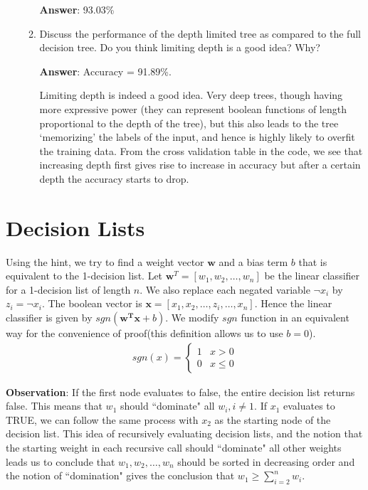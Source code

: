 \documentclass{article}
\begin{document}
\begin{enumerate}
\begin{enumerate}
            \textbf{Answer}: 93.03\%
            \item Discuss the performance of the depth limited tree as compared to the full decision tree. Do you think limiting depth is a good idea? Why?
            
            \textbf{Answer}: Accuracy = 91.89\%.
            
            Limiting depth is indeed a good idea. Very deep trees, though having more expressive power (they can represent boolean functions of length proportional to the depth of the tree), but this also leads to the tree `memorizing' the labels of the input, and hence is highly likely to overfit the training data. From the cross validation table in the code, we see that increasing depth first gives rise to increase in accuracy but after a certain depth the accuracy starts to drop.
        \end{enumerate}
\end{enumerate}

\section{Decision Lists}


Using the hint, we try to find a weight vector $\mathbf{w}$ and a bias term $b$ that is equivalent to the 1-decision list. Let $\mathbf{w}^T = [w_1, w_2,\ldots, w_n]$ be the linear classifier for a 1-decision list of length $n$. We also replace each negated variable $\lnot x_i$ by $z_i = \lnot x_i$. The boolean vector is $\mathbf{x} = [x_1, x_2, \ldots, z_i, \ldots, x_n]$. Hence the linear classifier is given by $sgn(\mathbf{w^Tx} + b)$. We modify $sgn$ function in an equivalent way for the convenience of proof(this definition allows us to use $b=0$).
\begin{align*}
    sgn(x) =  \begin{cases} 
                1 & x > 0 \\
                0 & x\leq 0
            \end{cases}
\end{align*}

\textbf{Observation}: If the first node evaluates to false, the entire decision list returns false. This means that $w_1$ should ``dominate" all $w_i, i \neq 1$. If $x_1$ evaluates to \textsc{TRUE}, we can follow the same process with $x_2$ as the starting node of the decision list. This idea of recursively evaluating decision lists, and the notion that the starting weight in each recursive call should ``dominate" all other weights leads us to conclude that $w_1, w_2, \ldots, w_n$ should be sorted in decreasing order and the notion of ``domination" gives the conclusion that $w_1 \geq \sum_{i=2}^{n} w_i$.\\
\end{document}
